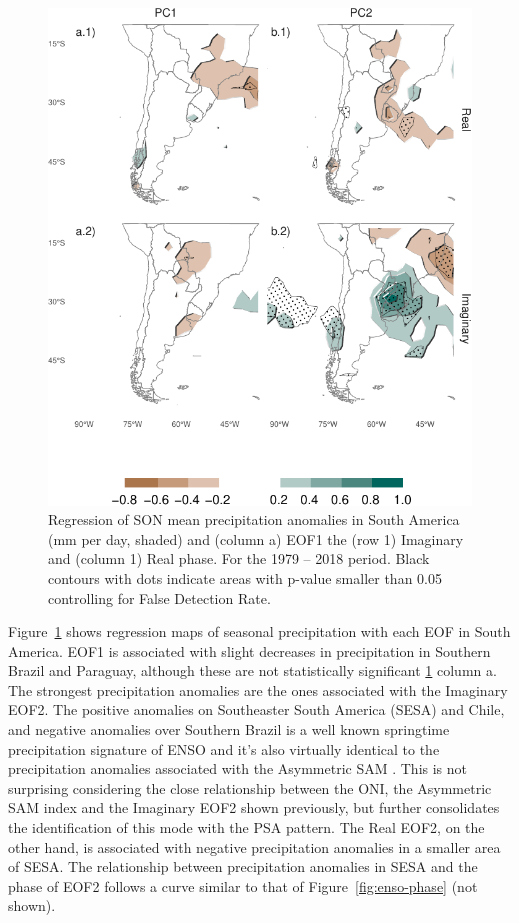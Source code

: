 \documentclass[smallextended]{svjour3}       %
\begin{document}
\begin{figure}
\centering
\includegraphics{../figures/pp-america-1.pdf}
\caption{\label{fig:pp-america}Regression of SON mean precipitation anomalies in South America (mm per day, shaded) and (column a) EOF1 the (row 1) Imaginary and (column 1) Real phase. For the 1979 -- 2018 period. Black contours with dots indicate areas with p-value smaller than 0.05 controlling for False Detection Rate.}
\end{figure}

Figure~\ref{fig:pp-america} shows regression maps of seasonal precipitation with each EOF in South America. EOF1 is associated with slight decreases in precipitation in Southern Brazil and Paraguay, although these are not statistically significant \ref{fig:pp-america} column a. The strongest precipitation anomalies are the ones associated with the Imaginary EOF2. The positive anomalies on Southeaster South America (SESA) and Chile, and negative anomalies over Southern Brazil is a well known springtime precipitation signature of ENSO \citep{cai2020a} and it's also virtually identical to the precipitation anomalies associated with the Asymmetric SAM \citep{campitelli2021}. This is not surprising considering the close relationship between the ONI, the Asymmetric SAM index and the Imaginary EOF2 shown previously, but further consolidates the identification of this mode with the PSA pattern. The Real EOF2, on the other hand, is associated with negative precipitation anomalies in a smaller area of SESA. The relationship between precipitation anomalies in SESA and the phase of EOF2 follows a curve similar to that of Figure~\ref{fig:enso-phase} (not shown).
\end{document}
